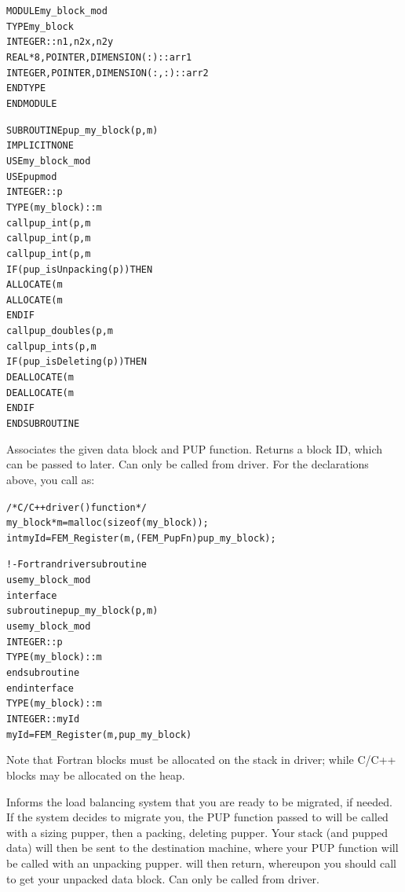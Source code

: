 \documentclass[10pt]{article}
\begin{document}
\begin{alltt}
     MODULE my_block_mod
       TYPE my_block
         INTEGER :: n1,n2x,n2y
         REAL*8, POINTER, DIMENSION(:) :: arr1
         INTEGER, POINTER, DIMENSION(:,:) :: arr2
       END TYPE
     END MODULE
 
     SUBROUTINE pup_my_block(p,m)
       IMPLICIT NONE
       USE my_block_mod
       USE pupmod
       INTEGER :: p
       TYPE(my_block) :: m
       call pup_int(p,m%
       call pup_int(p,m%
       call pup_int(p,m%
       IF (pup_isUnpacking(p)) THEN
         ALLOCATE(m%
         ALLOCATE(m%
       END IF
       call pup_doubles(p,m%
       call pup_ints(p,m%
       IF (pup_isDeleting(p)) THEN
         DEALLOCATE(m%
         DEALLOCATE(m%
       END IF
     END SUBROUTINE
\end{alltt}


     Associates the given data block and PUP function.  Returns a block
     ID, which can be passed to  later.  Can only be
     called from driver.  For the declarations above, you call
      as:

\begin{alltt}
          /*C/C++ driver() function*/
          my_block *m=malloc(sizeof(my_block));
          int myId=FEM_Register(m,(FEM_PupFn)pup_my_block);
 
          !- Fortran driver subroutine
          use my_block_mod
          interface
            subroutine pup_my_block(p,m)
              use my_block_mod
              INTEGER :: p
              TYPE(my_block) :: m
            end subroutine
          end interface
          TYPE(my_block) :: m
          INTEGER :: myId
          myId=FEM_Register(m,pup_my_block)
\end{alltt}

     Note that Fortran blocks must be allocated on the stack in driver;
     while C/C++ blocks may be allocated on the heap.


     Informs the load balancing system that you are ready to be
     migrated, if needed.  If the system decides to migrate you, the
     PUP function passed to  will be called with a sizing
     pupper, then a packing, deleting pupper.  Your stack (and pupped
     data) will then be sent to the destination machine, where your PUP
     function will be called with an unpacking pupper.  
     will then return, whereupon you should call  to
     get your unpacked data block.  Can only be called from driver.
\end{document}
